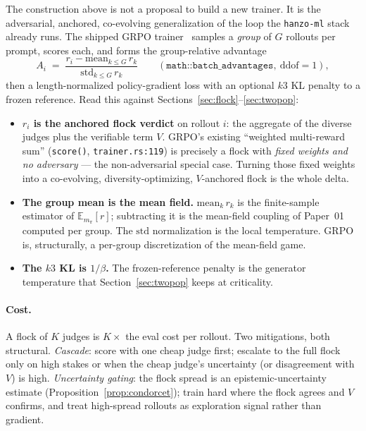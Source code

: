 \documentclass[11pt]{article}
\theoremstyle{definition}
\theoremstyle{remark}
\newcommand{\E}{\mathbb{E}}
\newcommand{\mpi}{m_{\pi}}
\begin{document}
The construction above is not a proposal to build a new trainer. It is the adversarial, anchored,
co-evolving generalization of the loop the \texttt{hanzo-ml} stack already runs. The shipped GRPO
trainer~\cite{hanzo-native-training,shao2024grpo} samples a \emph{group} of $G$ rollouts per prompt, scores
each, and forms the group-relative advantage
\[
  A_i \;=\; \frac{r_i - \mathrm{mean}_{k\le G}\, r_k}{\mathrm{std}_{k\le G}\, r_k}
  \qquad(\texttt{math::batch\_advantages},\ \text{ddof}=1),
\]
then a length-normalized policy-gradient loss with an optional $k3$ KL penalty to a frozen reference. Read
this against Sections~\ref{sec:flock}--\ref{sec:twopop}:

\begin{itemize}[leftmargin=1.4em,itemsep=2pt]
  \item \textbf{$r_i$ is the anchored flock verdict} on rollout $i$: the aggregate of the diverse judges
        plus the verifiable term $V$. GRPO's existing ``weighted multi-reward sum'' (\texttt{score()},
        \texttt{trainer.rs:119}) is precisely a flock with \emph{fixed weights and no adversary} --- the
        non-adversarial special case. Turning those fixed weights into a co-evolving, diversity-optimizing,
        $V$-anchored flock is the whole delta.
  \item \textbf{The group mean is the mean field.} $\mathrm{mean}_{k}\,r_k$ is the finite-sample estimator
        of $\E_{\mpi}[r]$; subtracting it is the mean-field coupling of Paper~01 computed per group. The
        $\mathrm{std}$ normalization is the local temperature. GRPO is, structurally, a per-group
        discretization of the mean-field game.
  \item \textbf{The $k3$ KL is $1/\beta$.} The frozen-reference penalty is the generator temperature that
        Section~\ref{sec:twopop} keeps at criticality.
\end{itemize}

\paragraph{Cost.} A flock of $K$ judges is $K\times$ the eval cost per rollout. Two mitigations, both
structural. \emph{Cascade}: score with one cheap judge first; escalate to the full flock only on high stakes
or when the cheap judge's uncertainty (or disagreement with $V$) is high. \emph{Uncertainty gating}: the
flock spread is an epistemic-uncertainty estimate (Proposition~\ref{prop:condorcet}); train hard where the
flock agrees and $V$ confirms, and treat high-spread rollouts as exploration signal rather than gradient.
\end{document}
